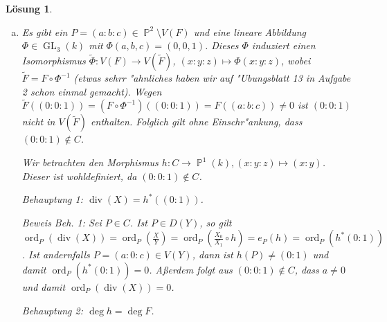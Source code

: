 \documentclass[a4paper, 12pt, numbers=noendperiod, chapterprefix=true]{scrbook}
\theoremstyle{break}
\newtheorem{Loes}{L\"osung}
\theoremstyle{nonumberbreak}
\theoremstyle{nonumberplain}
\DeclareMathOperator{\GL}{GL}
\DeclareMathOperator{\Divisor}{div}
\DeclareMathOperator{\ord}{ord}
\newcommand{\A}{\mathbb{A}}
\DeclareMathOperator{\Projective}{\mathbb{P}} %
\begin{document}
\begin{Loes}
\begin{enumerate}[a)]
\begin{figure}[htbp]
		\caption{$C\cap D(Y)$ mit $V(Z)$ ($x$-Achse).}
		\label{fig:DY}
	\end{figure}
	
\item
	Es gibt ein $P =(a:b:c)\in \Projective^2\setminus V(F)$ und eine lineare Abbildung $\Phi \in \GL_3(k)$ mit $\Phi(a,b,c) = (0,0,1)$. Dieses $\Phi$ induziert einen Isomorphismus $\tilde{\Phi} \colon V(F) \to V(\tilde{F})$, $(x:y:z) \mapsto \Phi(x:y:z)$, wobei $\tilde{F} = F \circ \Phi^{-1}$ (etwas sehrr "ahnliches haben wir auf "Ubungsblatt 13 in Aufgabe 2 schon einmal gemacht). Wegen $\tilde{F}((0:0:1)) = (F \circ \Phi^{-1})((0:0:1)) = F((a:b:c)) \neq 0$ ist $(0:0:1)$ nicht in $V(\tilde{F})$ enthalten. Folglich gilt ohne Einschr"ankung, dass $(0:0:1) \notin C$.

	Wir betrachten den Morphismus $h: C \to \Projective^1(k), (x:y:z) \mapsto(x:y)$. Dieser ist wohldefiniert, da $(0:0:1) \notin C$.

	\emph{Behauptung 1:} $\Divisor(X) = h^\ast((0:1))$.

	\emph{Beweis Beh. 1:} Sei $P\in C$. Ist $P \in D(Y)$, so gilt $\ord_P(\Divisor(X)) = \ord_P(\frac{X}{Y}) = \ord_P(\frac{X_0}{X_1} \circ h) = e_P(h) = \ord_P(h^\ast(0:1))$. Ist andernfalls $P = (a:0:c) \in V(Y)$, dann ist $h(P) \neq (0:1)$ und damit $\ord_P(h^\ast(0:1)) = 0$. A\ss erdem folgt aus $(0:0:1)\notin C$, dass $a \neq 0$ und damit $\ord_P(\Divisor(X)) = 0$.

	\emph{Behauptung 2:} $\deg h = \deg F$. 


\end{enumerate}
\end{Loes}
\end{document}

